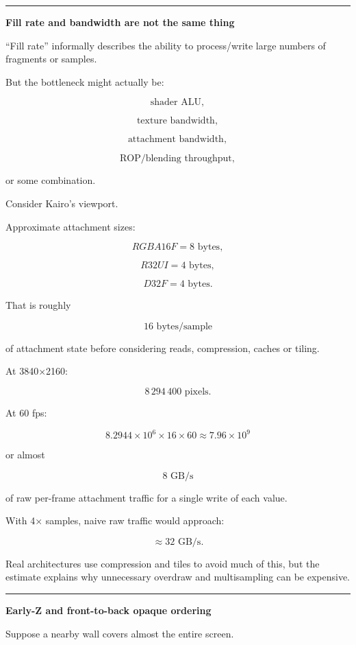 \begin{center}\rule{0.5\linewidth}{0.5pt}\end{center}

\textbf{Fill rate and bandwidth are not the same thing}

``Fill rate'' informally describes the ability to process/write large numbers of fragments or samples.

But the bottleneck might actually be:

\[
\text{shader ALU},
\]

\[
\text{texture bandwidth},
\]

\[
\text{attachment bandwidth},
\]

\[
\text{ROP/blending throughput},
\]

or some combination.

Consider Kairo's viewport.

Approximate attachment sizes:

\[
RGBA16F = 8\text{ bytes},
\]

\[
R32UI = 4\text{ bytes},
\]

\[
D32F = 4\text{ bytes}.
\]

That is roughly

\[
16\text{ bytes/sample}
\]

of attachment state before considering reads, compression, caches or tiling.

At 3840×2160:

\[
8\,294\,400\text{ pixels}.
\]

At 60 fps:

\[
8.2944\times10^6
\times16
\times60
\approx7.96\times10^9
\]

or almost

\[
\boxed{8\text{ GB/s}}
\]

of raw per-frame attachment traffic for a single write of each value.

With 4× samples, naive raw traffic would approach:

\[
\approx32\text{ GB/s}.
\]

Real architectures use compression and tiles to avoid much of this, but the estimate explains why unnecessary overdraw and multisampling can be expensive.

\begin{center}\rule{0.5\linewidth}{0.5pt}\end{center}

\textbf{Early-Z and front-to-back opaque ordering}

Suppose a nearby wall covers almost the entire screen.

